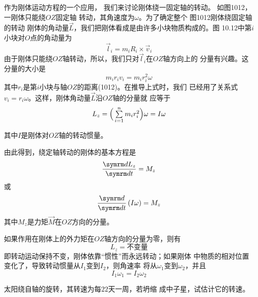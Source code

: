 作为刚体运动方程的一个应用，
我们来讨论刚体绕一固定轴的转动。
如图1012，一刚体只能绕$ OZ $固定轴
转动，其角速度为$\omega$。为了确定整个
图1012刚体绕固定轴的转动
刚体的角动量$\vec{L}$，我们把刚体看成是由许多小块物质构成的。图
10.12中第$ i $小块对$ O $点的角动量为
\begin{equation*}
    \vec{l} _ { i } = m _ i R _ i \times \vec{v} _ i
\end{equation*}
由于刚体只能绕$ OZ $轴转动，所以，我们只对$ \vec{l} _ i $在$ OZ $轴方向上的
分量有兴趣。这分量的大小是
\begin{equation*}
    m _ i r _ i v _i = m _ { i } r _ i ^ { 2 } \omega
\end{equation*}
其中$ r _ i $是第$ i $小块与轴$ OZ $的距离(1012)。在推导上式时，我们
已经用了关系式$ v _ i = r _ i \omega $。这样，刚体角动量$\vec{L}$沿$ OZ $轴的分量就
应等于\vspace{-0.8em}
\begin{equation}\label{eqn:10.04.06}
    L _ { z } = \Big( \textstyle\sum\limits_{ i = 1 } ^ { n } m _ { i } r _ i  ^ { 2 } \Big) \omega = I \omega
\end{equation}

\noindent
其中$ I $是刚体对$ OZ $轴的转动惯量。

由此得到，绕定轴转动的刚体的基本方程是
\begin{equation}\label{eqn:10.04.07}
    \frac {  \dif L _ { z } } {  \dif t } = M _ { z }
\end{equation}
或
\begin{equation}\label{eqn:10.04.08}
    \frac {  \dif } {  \dif t } \left( I \omega \right) = M _ { z }
\end{equation}
其中$ M _ { z } $是力矩$\vec{M}$在$ OZ $方向的分量。

如果作用在刚体上的外力矩在$ OZ $轴方向的分量为零，则有
\begin{equation*}
    L_ { z } = \text{不变量}
\end{equation*}
即转动运动保持不变，刚体依靠“惯性”而永远转动；如果刚体
中物质的相对位置变化了，导致转动惯量从$ I _ 1 $变到$ I _ 2 $，则角速率
将从$ \omega _ 1 $变到$ \omega _ 2 $，并且
\begin{equation}\label{eqn:10.04.09}
    I _ { 1 } \omega _ { 1 } = I _ { 2 } \omega _ { 2 }
\end{equation}

\example 太阳绕自轴的旋转，其转速为每$ 22 $天一周，若坍缩
成中子星，试估计它的转速。

